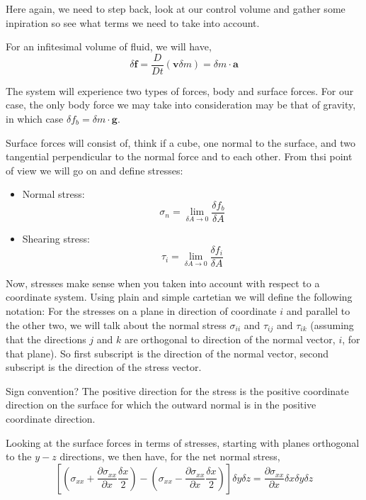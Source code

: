 \documentclass[10pt,a4paper,draft]{article}
\begin{document}
Here again, we need to step back, look at our control volume and gather some inpiration so see what terms we need to take into account.

For an infitesimal volume of fluid, we will have,
$$
\delta \mathbf{f} = \frac{D}{D t}\left(\mathbf{v} \delta m\right)
= \delta m \cdot \mathbf{a}
$$

The system will experience two types of forces, body and surface forces.
For our case, the only body force we may take into consideration may be that of gravity, in which case $\delta f_b = \delta m \cdot \mathbf{g}$.

Surface forces will consist of, think if a cube, one normal to the surface, and two tangential perpendicular to the normal force and to each other.
From thsi point of view we will go on and define stresses:

\begin{itemize}
\item Normal stress: 
$$\sigma_n = \lim_{\delta A \to 0} \frac{\delta f_b}{\delta A}$$

\item Shearing stress:
$$
\tau_i = \lim_{\delta A \to 0} \frac{\delta f_i}{\delta A}
$$
\end{itemize}

Now, stresses make sense when you taken into account with respect to a coordinate system.
Using plain and simple cartetian we will define the following notation:
For the stresses on a plane in direction of coordinate $i$ and parallel to the other two, we will talk about the normal stress $\sigma_{ii}$ and $\tau_{ij}$ and $\tau_{ik}$ (assuming that the directions $j$ and $k$ are orthogonal to direction of the normal vector, $i$, for that plane).
So first subscript is the direction of the normal vector, second subscript is the direction of the stress vector.

Sign convention? The positive direction for the stress is the positive coordinate direction on the surface for which the outward normal is in the positive coordinate direction.


Looking at the surface forces in terms of stresses, starting with planes orthogonal to the $y-z$ directions, we then have, for the net normal stress,
$$
\left[
	\left( 
	\sigma_{xx} 
	+ \frac{\partial \sigma_{xx}}{\partial x} \frac{\delta x}{2}
	\right)
	-
	\left( 
	\sigma_{xx} 
	- \frac{\partial \sigma_{xx}}{\partial x} \frac{\delta x}{2}
	\right)
\right] \delta y \delta z 
= \frac{\partial \sigma_{xx}}{\partial x} \delta x \delta y \delta z
$$
\end{document}
